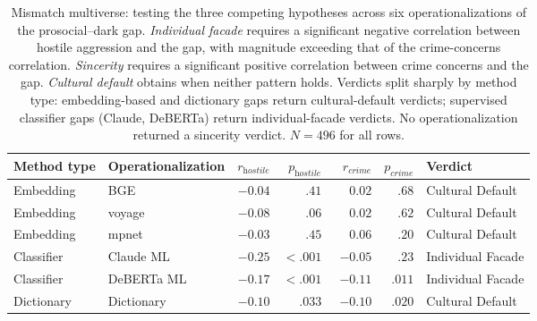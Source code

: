 \begin{table}[htbp]
  \centering
  \caption{Mismatch multiverse: testing the three competing hypotheses across six operationalizations of the prosocial--dark gap. \textit{Individual facade} requires a significant negative correlation between hostile aggression and the gap, with magnitude exceeding that of the crime-concerns correlation. \textit{Sincerity} requires a significant positive correlation between crime concerns and the gap. \textit{Cultural default} obtains when neither pattern holds. Verdicts split sharply by method type: embedding-based and dictionary gaps return cultural-default verdicts; supervised classifier gaps (Claude, DeBERTa) return individual-facade verdicts. No operationalization returned a sincerity verdict. $N = 496$ for all rows.}
  \label{tab:nlp_multiverse}
  \small
  \begin{tabular}{llrrrrl}
    \toprule
    Method type & Operationalization & $r_\textit{hostile}$ & $p_\textit{hostile}$ & $r_\textit{crime}$ & $p_\textit{crime}$ & Verdict \\
    \midrule
    Embedding   & BGE        & $-0.04$ & $.41$  & $\phantom{-}0.02$ & $.68$  & Cultural Default \\
    Embedding   & voyage     & $-0.08$ & $.06$  & $\phantom{-}0.02$ & $.62$  & Cultural Default \\
    Embedding   & mpnet      & $-0.03$ & $.45$  & $\phantom{-}0.06$ & $.20$  & Cultural Default \\
    Classifier  & Claude ML  & $-0.25$ & $<.001$ & $-0.05$           & $.23$  & Individual Facade \\
    Classifier  & DeBERTa ML & $-0.17$ & $<.001$ & $-0.11$           & $.011$ & Individual Facade \\
    Dictionary  & Dictionary & $-0.10$ & $.033$ & $-0.10$            & $.020$ & Cultural Default \\
    \bottomrule
  \end{tabular}
\end{table}
